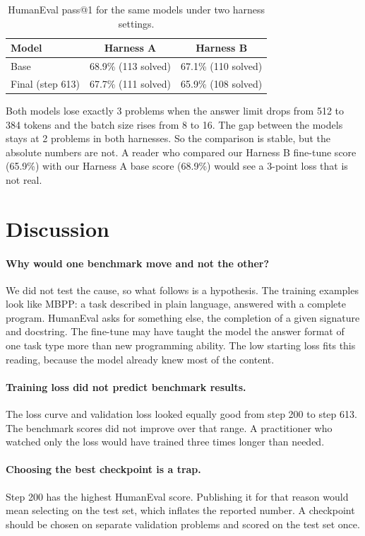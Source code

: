 \documentclass[11pt,a4paper]{article}
\begin{document}
\begin{table}[h]
\centering
\begin{tabular}{lcc}
\toprule
Model & Harness A & Harness B \\
\midrule
Base & 68.9\% (113 solved) & 67.1\% (110 solved) \\
Final (step 613) & 67.7\% (111 solved) & 65.9\% (108 solved) \\
\bottomrule
\end{tabular}
\caption{HumanEval pass@1 for the same models under two harness settings.}
\label{tab:sens}
\end{table}

Both models lose exactly 3 problems when the answer limit drops from 512 to 384 tokens and the batch size rises from 8 to 16. The gap between the models stays at 2 problems in both harnesses. So the comparison is stable, but the absolute numbers are not. A reader who compared our Harness B fine-tune score (65.9\%) with our Harness A base score (68.9\%) would see a 3-point loss that is not real.

\section{Discussion}
\paragraph{Why would one benchmark move and not the other?} We did not test the cause, so what follows is a hypothesis. The training examples look like MBPP: a task described in plain language, answered with a complete program. HumanEval asks for something else, the completion of a given signature and docstring. The fine-tune may have taught the model the answer format of one task type more than new programming ability. The low starting loss fits this reading, because the model already knew most of the content.

\paragraph{Training loss did not predict benchmark results.} The loss curve and validation loss looked equally good from step 200 to step 613. The benchmark scores did not improve over that range. A practitioner who watched only the loss would have trained three times longer than needed.

\paragraph{Choosing the best checkpoint is a trap.} Step 200 has the highest HumanEval score. Publishing it for that reason would mean selecting on the test set, which inflates the reported number. A checkpoint should be chosen on separate validation problems and scored on the test set once.
\end{document}
